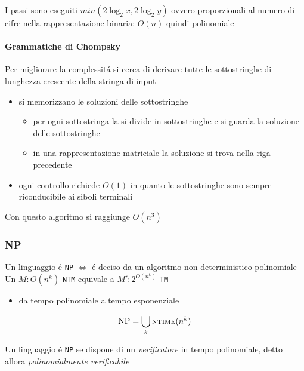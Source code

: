 \documentclass[
                        12pt, %
                        a4paper, %
                        oneside, %
                        headinclude,footinclude, %
                        BCOR5mm, %
                  ]{scrartcl}
\begin{document}
I passi sono eseguiti \(min(2 \log_{2} x, 2\log_{2} y)\) ovvero proporzionali al numero di cifre nella rappresentazione binaria: \(O(n)\) quindi \uline{polinomiale}

\paragraph{Grammatiche di Chompsky}
\label{sec:org4fe8466}
Per migliorare la complessitá si cerca di derivare tutte le sottostringhe di lunghezza crescente della stringa di input
\begin{itemize}
\item si memorizzano le soluzioni delle sottostringhe
\begin{itemize}
\item per ogni sottostringa la si divide in sottostringhe e si guarda la soluzione delle sottostringhe
\item in una rappresentazione matriciale la soluzione si trova nella riga precedente
\end{itemize}
\item ogni controllo richiede \(O(1)\) in quanto le sottostringhe sono sempre riconducibile ai siboli terminali
\end{itemize}
Con questo algoritmo si raggiunge \(O(n^3)\)

\subsubsection{NP}
\label{sec:org03a9610}
Un linguaggio é \texttt{NP} \(\iff\) é deciso da un algoritmo \uline{non deterministico polinomiale}
Un \(M: O(n^k)\) \texttt{NTM} equivale a \(M': 2^{O(n^k)}\) \texttt{TM}
\begin{itemize}
\item da tempo polinomiale a tempo esponenziale
\end{itemize}

\[\text{NP} = \bigcup_k \textsc{ntime}(n^k)\]

Un linguaggio é \texttt{NP} se dispone di un \emph{verificatore} in tempo polinomiale, detto allora \emph{polinomialmente verificabile}
\end{document}
